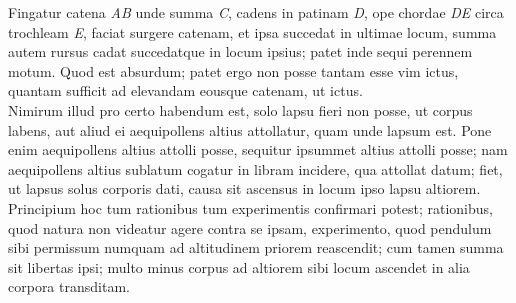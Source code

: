 \pend
\count{}
\count{}
\count{}
\vspace{1.5em}
\pstart  
\noindent
Fingatur catena  \textit{AB} unde summa \textit{C}, cadens in patinam \textit{D}, ope chordae \textit{DE} circa trochleam \textit{E}, faciat surgere catenam, et ipsa succedat in ultimae locum, summa autem rursus cadat succedatque in locum ipsius; patet inde sequi perennem motum\protect{}. Quod est absurdum; patet
ergo non posse tantam esse vim ictus\protect{}, quantam sufficit ad elevandam eousque catenam, ut  ictus\protect{}.
\\\indent
Nimirum illud pro certo habendum est, solo lapsu\protect{} fieri non posse, ut corpus labens, aut aliud ei aequipollens altius attollatur, quam unde lapsum\protect{} est. Pone enim aequipollens altius attolli posse, sequitur ipsummet altius attolli posse; nam aequipollens altius sublatum cogatur in libram incidere, qua attollat datum; fiet, ut lapsus\protect{} solus corporis dati, causa sit ascensus in locum ipso lapsu\protect{} altiorem.
\pend
\pstart
Principium\protect{} hoc tum rationibus tum experimentis\protect{} confirmari potest; rationibus, quod natura non videatur agere contra se ipsam, experimento\protect{}, quod pendulum sibi permissum numquam ad altitudinem priorem reascendit; cum tamen summa sit libertas ipsi; multo minus corpus ad altiorem sibi locum ascendet  in alia corpora transditam. 
